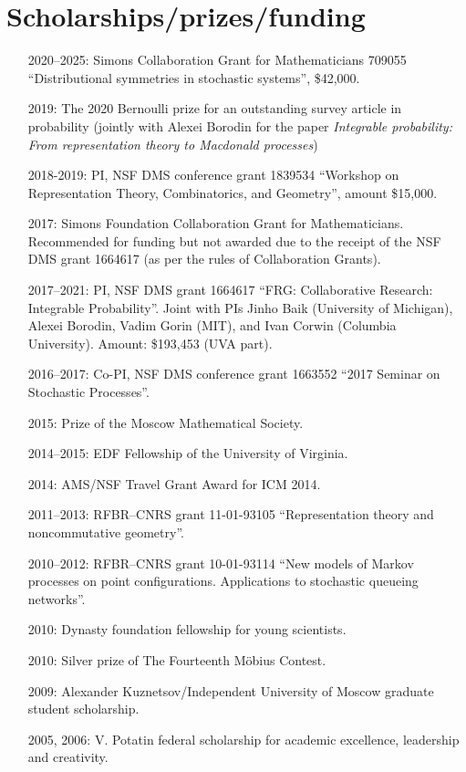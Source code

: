 \documentclass[letterpaper,11pt]{article}
\begin{document}
\section*{Scholarships/prizes/funding}
\begin{itemize}
	\item [2020--2025:]
		Simons Collaboration Grant for Mathematicians 709055
		``Distributional symmetries in stochastic systems'',
		\$42,000.
	\item [2019:] 
		The 2020 Bernoulli prize for an outstanding survey article in probability 
		(jointly with Alexei Borodin for the paper \emph{Integrable probability: From representation theory to
		Macdonald processes})
	\item
		[2018-2019:] PI,
				NSF DMS conference grant 
				1839534
				``Workshop on Representation Theory, Combinatorics, and Geometry'',
				amount \$15,000.

		
	\item
	      [2017:] Simons Foundation Collaboration Grant for
	      Mathematicians. Recommended for funding but not awarded due to
	      the receipt of the NSF DMS grant 1664617 (as per the rules of Collaboration
	      Grants).
	\item
			[2017--2021:] PI, NSF DMS grant 1664617
	      ``FRG: Collaborative Research: Integrable Probability''.
	      Joint with PIs Jinho Baik (University of Michigan), Alexei
	      Borodin, Vadim Gorin (MIT), and Ivan Corwin (Columbia University). Amount:
	      \$193,453 (UVA part).
	\item
		[2016--2017:] Co-PI,
	      NSF DMS conference grant 1663552 ``2017 Seminar on Stochastic
				Processes''.
	\item
	      [2015:] Prize of the Moscow Mathematical Society.
	\item
	      [2014--2015:] EDF Fellowship of the University of Virginia.
	\item
	      [2014:] AMS/NSF Travel Grant Award for ICM 2014.
	\item
	      [2011--2013:] RFBR--CNRS grant 11-01-93105 ``Representation
	      theory and noncommutative geometry''.
	\item
	      [2010--2012:] RFBR--CNRS grant 10-01-93114 ``New models of
	      Markov processes on point configurations. Applications to
	      stochastic queueing networks''.
	\item
	      [2010:] Dynasty foundation fellowship for young scientists.
	\item
	      [2010:] Silver prize of The Fourteenth M\"obius Contest.
	\item
	      [2009:] Alexander Kuznetsov/Independent University of Moscow
	      graduate student scholarship.
	\item
	      [2005, 2006:] V. Potatin federal scholarship for academic
	      excellence, leadership and creativity.
\end{itemize}
\end{document}
